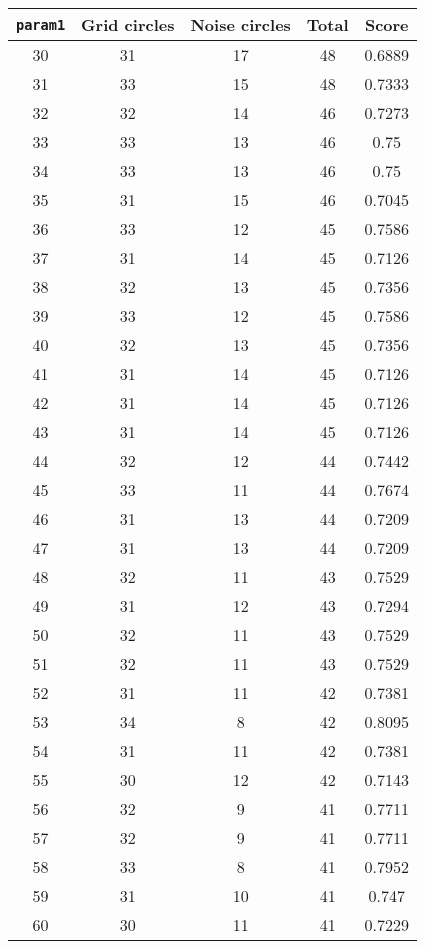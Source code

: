 \documentclass[letterpaper, 12pt]{article}
\begin{document}
\begin{longtable}{|c|c|c|c|c|}
\hline
\textbf{\texttt{param1}} & \textbf{Grid circles} & \textbf{Noise circles} & \textbf{Total} & \textbf{Score} \\
\hline
30 & 31 & 17 & 48 & 0.6889 \\
\hline
31 & 33 & 15 & 48 & 0.7333 \\
\hline
32 & 32 & 14 & 46 & 0.7273 \\
\hline
33 & 33 & 13 & 46 & 0.75 \\
\hline
34 & 33 & 13 & 46 & 0.75 \\
\hline
35 & 31 & 15 & 46 & 0.7045 \\
\hline
36 & 33 & 12 & 45 & 0.7586 \\
\hline
37 & 31 & 14 & 45 & 0.7126 \\
\hline
38 & 32 & 13 & 45 & 0.7356 \\
\hline
39 & 33 & 12 & 45 & 0.7586 \\
\hline
40 & 32 & 13 & 45 & 0.7356 \\
\hline
41 & 31 & 14 & 45 & 0.7126 \\
\hline
42 & 31 & 14 & 45 & 0.7126 \\
\hline
43 & 31 & 14 & 45 & 0.7126 \\
\hline
44 & 32 & 12 & 44 & 0.7442 \\
\hline
45 & 33 & 11 & 44 & 0.7674 \\
\hline
46 & 31 & 13 & 44 & 0.7209 \\
\hline
47 & 31 & 13 & 44 & 0.7209 \\
\hline
48 & 32 & 11 & 43 & 0.7529 \\
\hline
49 & 31 & 12 & 43 & 0.7294 \\
\hline
50 & 32 & 11 & 43 & 0.7529 \\
\hline
51 & 32 & 11 & 43 & 0.7529 \\
\hline
52 & 31 & 11 & 42 & 0.7381 \\
\hline
53 & 34 & 8 & 42 & 0.8095 \\
\hline
54 & 31 & 11 & 42 & 0.7381 \\
\hline
55 & 30 & 12 & 42 & 0.7143 \\
\hline
56 & 32 & 9 & 41 & 0.7711 \\
\hline
57 & 32 & 9 & 41 & 0.7711 \\
\hline
58 & 33 & 8 & 41 & 0.7952 \\
\hline
59 & 31 & 10 & 41 & 0.747 \\
\hline
60 & 30 & 11 & 41 & 0.7229 \\

\end{longtable}
\end{document}
